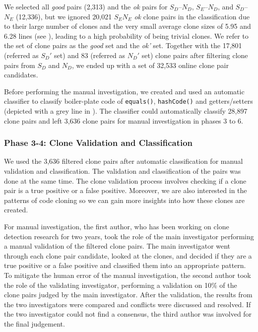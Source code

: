\documentclass[sigconf,review, anonymous]{acmart}
\begin{document}
We selected all \textit{good} pairs (2,313) and the \textit{ok} pairs for
$S_D$--$N_D$, $S_E$--$N_D$, and $S_D$--$N_E$ (12,336), but we ignored
20,021 $S_EN_E$ \textit{ok} clone pairs in the classification due to
their large number of clones and the very small average clone sizes of
5.95 and 6.28 lines (see ), leading to a high
probability of being trivial clones. We refer to the set of clone
pairs as the \textit{good} set and the \textit{ok'} set.
Together with the 17,801 (referred as $S_D'$ set) and 83 (referred as
$N_D'$ set) clone pairs after filtering clone pairs from $S_D$ and
$N_D$, we ended up with a set of 32,533 online clone pair candidates.

Before performing the manual
investigation, we created and used an automatic classifier 
to classify boiler-plate code of {\small\texttt{equals()}}, 
{\small\texttt{hashCode()}} and getters/setters 
(depicted with a grey line in ).
The classifier could automatically classify 28,897 clone pairs 
and left 3,636 clone pairs for manual investigation in phases 3 to 6.

\subsubsection{Phase 3-4: Clone Validation and Classification}
We used the 3,636 filtered clone pairs after automatic classification for
manual validation and classification.
The validation and classification of the pairs was done at the same time. 
The clone validation process involves checking 
if a clone pair is a true positive or a false positive. 
Moreover, we are also interested in the patterns of code cloning 
so we can gain more insights into how these clones are created. 

For manual investigation, the first author, who has been working on clone detection research for 
two years, took the role of the main investigator performing a manual 
validation of the filtered clone pairs. 
The main investigator went through each clone pair candidate, 
looked at the clones, and decided if they are a true positive or a
false positive and classified them into an appropriate pattern. 
To mitigate the human error of the manual investigation, 
the second author took the role of the validating investigator, performing a
validation on 10\% of the clone pairs judged by the main
investigator. After the validation, the results from the two
investigators were compared and conflicts were discussed and resolved.
If the two investigator could not find a consensus, the third author was 
involved for the final judgement.
\end{document}
